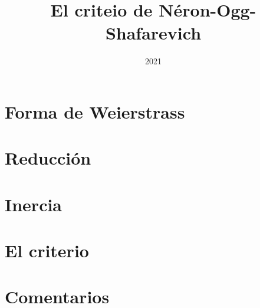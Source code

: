 \documentclass[11pt]{article}
\title{El criteio de N\'{e}ron-Ogg-Shafarevich}
\author{}
\date{2021} %
\begin{document}
\renewcommand{\refname}{Referencias}
\maketitle
\tableofcontents


\section*{\null}


\section{Forma de Weierstrass}\label{sec:formadeweierstrass}


\section{Reducci\'{o}n}\label{sec:reduccion}


\section{Inercia}\label{sec:inercia}


\section{El criterio}\label{sec:elcriterio}


\section{Comentarios}\label{sec:comentarios}



\printbibliography[heading=bibintoc,title=\refname]
\end{document}
